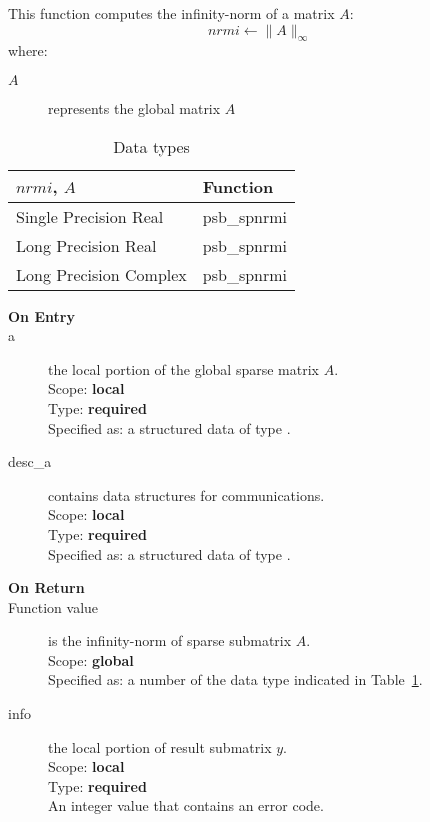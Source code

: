 %
%



This function computes the infinity-norm of a matrix $A$:\\

\[ nrmi \leftarrow \|A\|_\infty \]
where:
\begin{description}
\item[$A$] represents the global matrix $A$
\end{description}

\begin{table}[h]
\begin{center}
\begin{tabular}{ll}
\hline
$nrmi$, $A$ & {\bf Function}\\
\hline
Single Precision Real & psb\_spnrmi\\
Long Precision Real & psb\_spnrmi \\
Long Precision Complex & psb\_spnrmi \\
\hline
\end{tabular}
\end{center}
\caption{Data types\label{tab:f90nrmi}}
\end{table}


\begin{description}
\item[\bf On Entry]
\item[a] the local  portion of the global sparse matrix
$A$. \\   
Scope: {\bf local} \\
Type: {\bf required}\\
Specified as: a structured data of type \spdata.
\item[desc\_a] contains data structures for communications.\\
Scope: {\bf local} \\
Type: {\bf required}\\
Specified as: a structured data of type \descdata.
\item[\bf On Return] 
\item[Function value] is the infinity-norm of sparse submatrix $A$.\\
Scope: {\bf global} \\
Specified as: a number of the data type indicated in Table~\ref{tab:f90nrmi}.
\item[info] the local portion of result submatrix $y$.\\
Scope: {\bf local} \\
Type: {\bf required} \\
An integer value that contains an error code. 
\end{description}



